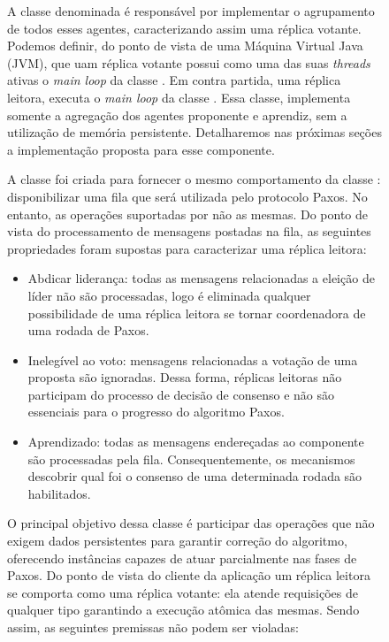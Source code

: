 \begin{figure}[ht]
A classe denominada  é responsável por implementar o
agrupamento de todos esses agentes, caracterizando assim uma réplica votante. Podemos
definir, do ponto de vista de uma Máquina Virtual Java (JVM), que uam réplica votante
possui como uma das suas \emph{threads} ativas o \emph{main loop} da classe
. Em contra partida, uma réplica leitora, executa o
\emph{main loop} da classe . Essa classe, implementa somente
a agregação dos agentes proponente e aprendiz, sem a utilização de memória persistente.
Detalharemos nas próximas seções a implementação proposta para esse componente.


A classe  foi criada para fornecer o mesmo comportamento da
classe : disponibilizar uma fila que será utilizada pelo
protocolo Paxos. No entanto, as operações suportadas por 
não as mesmas. Do ponto de vista do processamento de mensagens postadas na fila, as
seguintes propriedades foram supostas para caracterizar uma réplica leitora:

\begin{itemize}
  \item Abdicar liderança: todas as mensagens relacionadas a eleição de líder não são
    processadas, logo é eliminada qualquer possibilidade de uma réplica leitora se tornar
    coordenadora de uma rodada de Paxos.
  \item Inelegível ao voto: mensagens relacionadas a votação de uma proposta são
    ignoradas. Dessa forma, réplicas leitoras não participam do processo de decisão de
    consenso e não são essenciais para o progresso do algoritmo Paxos.
  \item Aprendizado: todas as mensagens endereçadas ao componente  são
    processadas pela fila. Consequentemente, os mecanismos descobrir qual foi o consenso
    de uma determinada rodada são habilitados.
\end{itemize}

O principal objetivo dessa classe é participar das operações que não exigem dados
persistentes para garantir correção do algoritmo, oferecendo instâncias capazes de atuar
parcialmente nas fases de Paxos. Do ponto de vista do cliente da aplicação um réplica
leitora se comporta como uma réplica votante: ela atende requisições de qualquer tipo
garantindo a execução atômica das mesmas. Sendo assim, as seguintes premissas não podem
ser violadas:


\end{figure}
